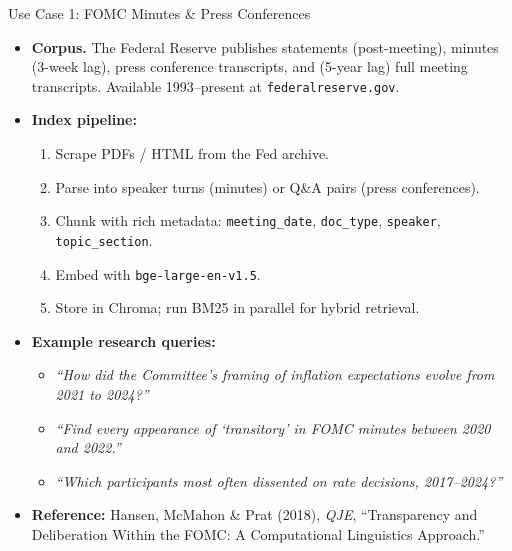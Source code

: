 \begin{frame}{Use Case 1: FOMC Minutes \& Press Conferences}
\begin{itemize}
\item \textbf{Corpus.} The Federal Reserve publishes statements (post-meeting), minutes (3-week lag), press conference transcripts, and (5-year lag) full meeting transcripts. Available 1993--present at \texttt{federalreserve.gov}.

\medskip
\item \textbf{Index pipeline:}
\begin{enumerate}
    \item Scrape PDFs / HTML from the Fed archive.
    \item Parse into speaker turns (minutes) or Q\&A pairs (press conferences).
    \item Chunk with rich metadata: \texttt{meeting\_date}, \texttt{doc\_type}, \texttt{speaker}, \texttt{topic\_section}.
    \item Embed with \texttt{bge-large-en-v1.5}.
    \item Store in Chroma; run BM25 in parallel for hybrid retrieval.
\end{enumerate}

\medskip
\item \textbf{Example research queries:}
\begin{itemize}
    \item \emph{``How did the Committee's framing of inflation expectations evolve from 2021 to 2024?''}
    \item \emph{``Find every appearance of `transitory' in FOMC minutes between 2020 and 2022.''}
    \item \emph{``Which participants most often dissented on rate decisions, 2017--2024?''}
\end{itemize}

\medskip
\item \textbf{Reference:} Hansen, McMahon \& Prat (2018), \emph{QJE}, ``Transparency and Deliberation Within the FOMC: A Computational Linguistics Approach.''
\end{itemize}
\end{frame}

